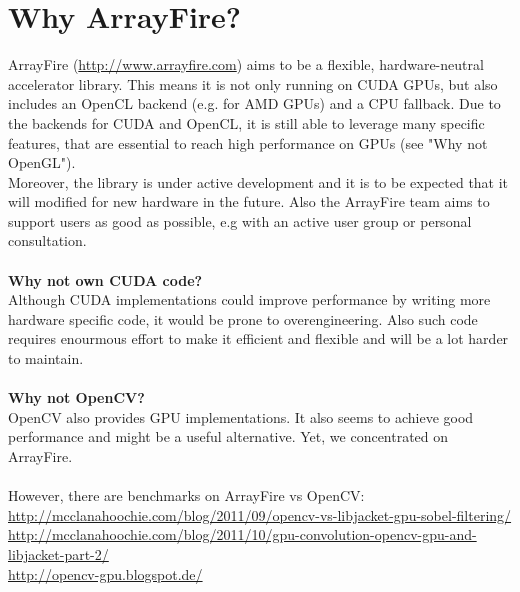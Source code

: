 \documentclass[12pt,a4paper]{article}
\begin{document}
\section{Why ArrayFire?}
ArrayFire (\url{http://www.arrayfire.com}) aims to be a flexible, hardware-neutral accelerator library.
This means it is not only running on CUDA GPUs, but also includes an OpenCL backend (e.g. for AMD GPUs) and a CPU fallback.
Due to the backends for CUDA and OpenCL, it is still able to leverage many specific features, that are essential to reach high performance on GPUs (see "Why not OpenGL"). \\
Moreover, the library is under active development and it is to be expected that it will modified for new hardware in the future.
Also the ArrayFire team aims to support users as good as possible, e.g with an active user group or personal consultation. \\ \\
\textbf{Why not own CUDA code?}\\
Although CUDA implementations could improve performance by writing more hardware specific code, it would be prone to overengineering.
Also such code requires enourmous effort to make it efficient and flexible and will be a lot harder to maintain. \\ \\
\textbf{Why not OpenCV?} \\
OpenCV also provides GPU implementations.
It also seems to achieve good performance and might be a useful alternative.
Yet, we concentrated on ArrayFire.\\\\
However, there are benchmarks on ArrayFire vs OpenCV:\\
\url{http://mcclanahoochie.com/blog/2011/09/opencv-vs-libjacket-gpu-sobel-filtering/} \\
\url{http://mcclanahoochie.com/blog/2011/10/gpu-convolution-opencv-gpu-and-libjacket-part-2/} \\
\url{http://opencv-gpu.blogspot.de/} \\ \\
\end{document}
